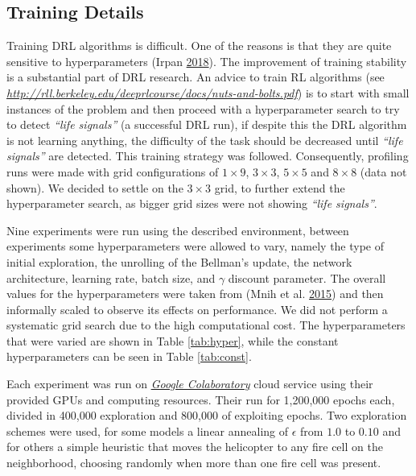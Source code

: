 \documentclass[
  12pt,
  openany]{book}
\begin{document}
\hypertarget{training-details}{%
\subsection{Training Details}\label{training-details}}

Training DRL algorithms is difficult. One of the reasons is that they are quite sensitive to hyperparameters (Irpan \protect\hyperlink{ref-rlblogpost}{2018}). The improvement of training stability is a substantial part of DRL research. An advice to train RL algorithms (see \emph{\url{http://rll.berkeley.edu/deeprlcourse/docs/nuts-and-bolts.pdf}}) is to start with small instances of the problem and then proceed with a hyperparameter search to try to detect \emph{``life signals''} (a successful DRL run), if despite this the DRL algorithm is not learning anything, the difficulty of the task should be decreased until \emph{``life signals''} are detected. This training strategy was followed. Consequently, profiling runs were made with grid configurations of \(1 \times 9\), \(3 \times 3\), \(5 \times 5\) and \(8 \times 8\) (data not shown). We decided to settle on the \(3 \times 3\) grid, to further extend the hyperparameter search, as bigger grid sizes were not showing \emph{``life signals''}.

Nine experiments were run using the described environment, between experiments some hyperparameters were allowed to vary, namely the type of initial exploration, the unrolling of the Bellman's update, the network architecture, learning rate, batch size, and \(\gamma\) discount parameter. The overall values for the hyperparameters were taken from (Mnih et al. \protect\hyperlink{ref-mnih2015human}{2015}) and then informally scaled to observe its effects on performance. We did not perform a systematic grid search due to the high computational cost. The hyperparameters that were varied are shown in Table \ref{tab:hyper}, while the constant hyperparameters can be seen in Table \ref{tab:const}.

Each experiment was run on \emph{\href{https://colab.research.google.com}{Google Colaboratory}} cloud service using their provided GPUs and computing resources. Their run for 1,200,000 epochs each, divided in 400,000 exploration and 800,000 of exploiting epochs. Two exploration schemes were used, for some models a linear annealing of \(\epsilon\) from \(1.0\) to \(0.10\) and for others a simple heuristic that moves the helicopter to any fire cell on the neighborhood, choosing randomly when more than one fire cell was present.
\end{document}
